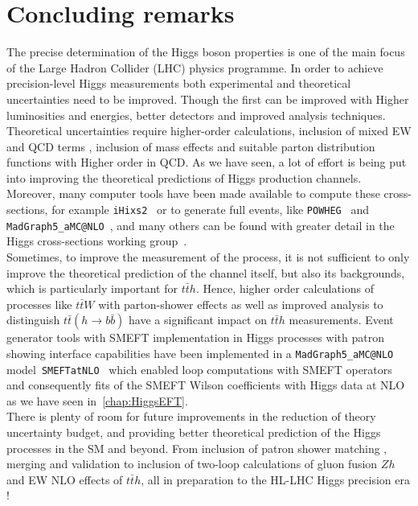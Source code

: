 \section{Concluding remarks \label{sec:singlehiggsconc}  }
The precise determination of the Higgs boson properties is one of the main focus of the Large Hadron Collider (LHC) physics programme. In order to achieve precision-level Higgs measurements both experimental and theoretical uncertainties need to be improved. Though the first can be improved with Higher luminosities and energies, better detectors and improved analysis techniques. Theoretical uncertainties require higher-order calculations, inclusion of mixed EW and QCD terms , inclusion of mass effects and suitable parton distribution functions with Higher order in QCD.  As we have seen, a lot of effort is being put into improving the theoretical predictions of Higgs production channels. Moreover, many computer tools have been made available to compute these cross-sections, for example  \texttt{iHixs2}~\cite{Dulat:2018rbf} or to generate full events, like \texttt{POWHEG}~\cite{Alioli:2008tz,Nason:2009ai,Bagnaschi:2011tu,Campbell:2012am,Luisoni:2013cuh,Jager:2014vna,Hartanto:2015uka} and \texttt{MadGraph5\_aMC@NLO}~\cite{Alwall:2014hca}, and many others can be found with greater detail in the Higgs cross-sections working group~\cite{HXSWG}.  \\ Sometimes, to improve the measurement of the process, it is not sufficient to only improve the theoretical prediction of the channel itself, but also its backgrounds, which is particularly important for $t\bar th $. Hence, higher order calculations of processes like $t\bar t W$ with parton-shower effects as well as improved analysis to distinguish $t\bar t(h \to b \bar b) $ have a significant impact on  $t\bar th $ measurements.
Event generator tools with SMEFT implementation in Higgs processes with patron showing interface capabilities  have been implemented in a \texttt{MadGraph5\_aMC@NLO} model~\texttt{SMEFTatNLO}~\cite{Degrande:2020evl} which enabled loop computations with SMEFT operators and consequently fits of the SMEFT Wilson coefficients with Higgs data at NLO as we have seen in~\autoref{chap:HiggsEFT}.\\
There is plenty of room for future improvements in the reduction of theory uncertainty budget, and providing better theoretical prediction of the Higgs processes in the SM and beyond. From inclusion of patron shower matching , merging and validation to  inclusion of two-loop calculations of gluon fusion $Zh$  and EW NLO effects of  $t\bar th $, all in preparation to the HL-LHC Higgs precision era ! 

